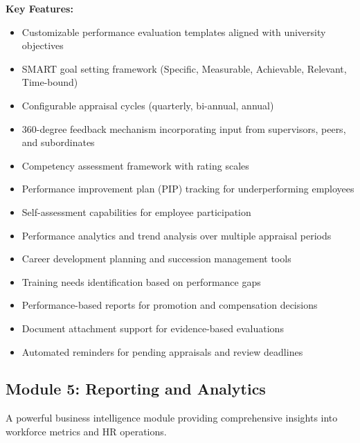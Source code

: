 \documentclass[12pt]{article}
\begin{document}
\textbf{Key Features:}
\begin{itemize}[noitemsep]
\item Customizable performance evaluation templates aligned with university objectives
\item SMART goal setting framework (Specific, Measurable, Achievable, Relevant, Time-bound)
\item Configurable appraisal cycles (quarterly, bi-annual, annual)
\item 360-degree feedback mechanism incorporating input from supervisors, peers, and subordinates
\item Competency assessment framework with rating scales
\item Performance improvement plan (PIP) tracking for underperforming employees
\item Self-assessment capabilities for employee participation
\item Performance analytics and trend analysis over multiple appraisal periods
\item Career development planning and succession management tools
\item Training needs identification based on performance gaps
\item Performance-based reports for promotion and compensation decisions
\item Document attachment support for evidence-based evaluations
\item Automated reminders for pending appraisals and review deadlines
\end{itemize}

\subsection{Module 5: Reporting and Analytics}

A powerful business intelligence module providing comprehensive insights into workforce metrics and HR operations.
\end{document}
